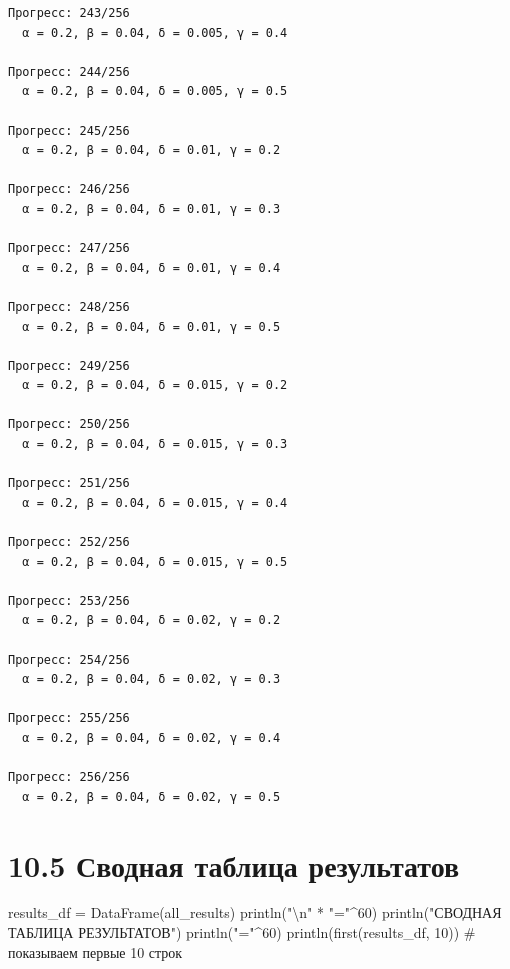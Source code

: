 \documentclass[
  12pt,
  a4paper,
  DIV=11,
  numbers=noendperiod]{scrreprt}
\newenvironment{Shaded}{\begin{snugshade}}{\end{snugshade}}
\newcommand{\CommentTok}[1]{\textcolor[rgb]{0.37,0.37,0.37}{#1}}
\newcommand{\FloatTok}[1]{\textcolor[rgb]{0.68,0.00,0.00}{#1}}
\newcommand{\FunctionTok}[1]{\textcolor[rgb]{0.28,0.35,0.67}{#1}}
\newcommand{\NormalTok}[1]{\textcolor[rgb]{0.00,0.23,0.31}{#1}}
\newcommand{\OperatorTok}[1]{\textcolor[rgb]{0.37,0.37,0.37}{#1}}
\newcommand{\SpecialCharTok}[1]{\textcolor[rgb]{0.37,0.37,0.37}{#1}}
\newcommand{\StringTok}[1]{\textcolor[rgb]{0.13,0.47,0.30}{#1}}
\begin{document}
\begin{verbatim}
Прогресс: 243/256
  α = 0.2, β = 0.04, δ = 0.005, γ = 0.4

Прогресс: 244/256
  α = 0.2, β = 0.04, δ = 0.005, γ = 0.5

Прогресс: 245/256
  α = 0.2, β = 0.04, δ = 0.01, γ = 0.2

Прогресс: 246/256
  α = 0.2, β = 0.04, δ = 0.01, γ = 0.3

Прогресс: 247/256
  α = 0.2, β = 0.04, δ = 0.01, γ = 0.4

Прогресс: 248/256
  α = 0.2, β = 0.04, δ = 0.01, γ = 0.5

Прогресс: 249/256
  α = 0.2, β = 0.04, δ = 0.015, γ = 0.2

Прогресс: 250/256
  α = 0.2, β = 0.04, δ = 0.015, γ = 0.3

Прогресс: 251/256
  α = 0.2, β = 0.04, δ = 0.015, γ = 0.4

Прогресс: 252/256
  α = 0.2, β = 0.04, δ = 0.015, γ = 0.5

Прогресс: 253/256
  α = 0.2, β = 0.04, δ = 0.02, γ = 0.2

Прогресс: 254/256
  α = 0.2, β = 0.04, δ = 0.02, γ = 0.3

Прогресс: 255/256
  α = 0.2, β = 0.04, δ = 0.02, γ = 0.4

Прогресс: 256/256
  α = 0.2, β = 0.04, δ = 0.02, γ = 0.5
\end{verbatim}

\section{10.5 Сводная таблица
результатов}\label{ux441ux432ux43eux434ux43dux430ux44f-ux442ux430ux431ux43bux438ux446ux430-ux440ux435ux437ux443ux43bux44cux442ux430ux442ux43eux432-1}

\begin{Shaded}
\begin{Highlighting}[]
\NormalTok{results\_df }\OperatorTok{=} \FunctionTok{DataFrame}\NormalTok{(all\_results)}
\FunctionTok{println}\NormalTok{(}\StringTok{"}\SpecialCharTok{\textbackslash{}n}\StringTok{"} \OperatorTok{*} \StringTok{"="}\OperatorTok{\^{}}\FloatTok{60}\NormalTok{)}
\FunctionTok{println}\NormalTok{(}\StringTok{"СВОДНАЯ ТАБЛИЦА РЕЗУЛЬТАТОВ"}\NormalTok{)}
\FunctionTok{println}\NormalTok{(}\StringTok{"="}\OperatorTok{\^{}}\FloatTok{60}\NormalTok{)}
\FunctionTok{println}\NormalTok{(}\FunctionTok{first}\NormalTok{(results\_df, }\FloatTok{10}\NormalTok{))  }\CommentTok{\# показываем первые 10 строк}
\end{Highlighting}
\end{Shaded}
\end{document}
